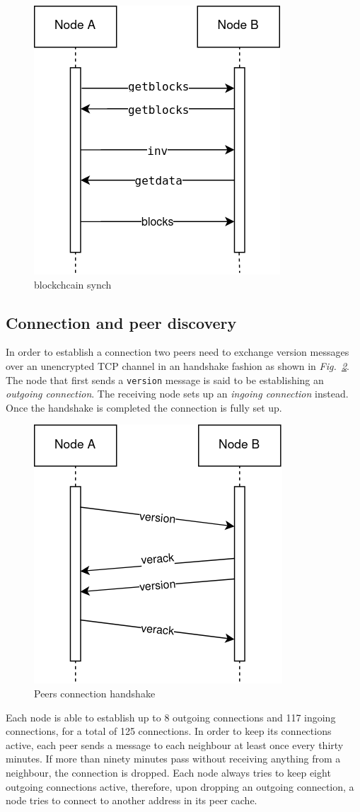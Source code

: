 \documentclass[12pt, letterpaper, twoside]{article}
\begin{document}
\begin{figure}[h!]
	\includegraphics[width=.45\textwidth]{pict/blockchain-synch.png}
	\centering
	\caption{blockchcain synch}
	\label{fig:synch}
\end{figure}

\subsection{Connection and peer discovery}\label{sec:peerdisc}
In order to establish a connection two peers need to exchange version messages over an unencrypted TCP channel in an handshake fashion as shown in \emph{Fig.~\ref{fig:btcconn}}. The node that first sends a \texttt{version} message is said to be establishing an \emph{outgoing connection}. The receiving node sets up an \emph{ingoing connection} instead. Once the handshake is completed the connection is fully set up.

\begin{figure}[h]
	\includegraphics[width=.45\textwidth]{pict/BTCconnection.png}
	\centering
	\caption{Peers connection handshake}
	\label{fig:btcconn}
\end{figure}

Each node is able to establish up to 8 outgoing connections and 117 ingoing connections, for a total of 125 connections. In order to keep its connections active, each peer sends a message to each neighbour at least once every thirty minutes. If more than ninety minutes pass without receiving anything from a neighbour, the connection is dropped. Each node always tries to keep eight outgoing connections active, therefore, upon dropping an outgoing connection, a node tries to connect to another address in its peer cache.
\end{document}
